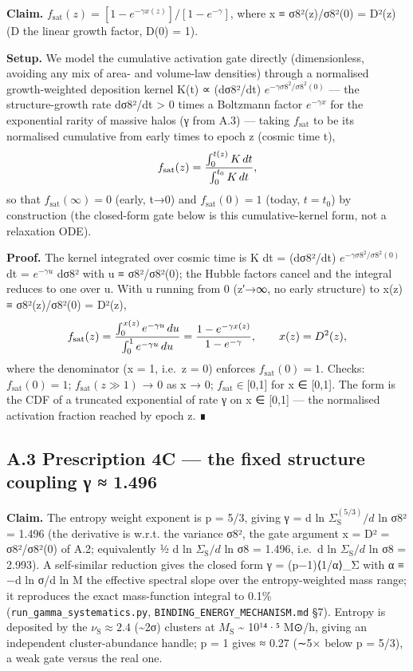 \documentclass[
  10pt,
]{article}
\begin{document}
\textbf{Claim.}
\(f_{\mathrm{sat}}(z) = [1 - e^{-\gamma  x(z)}]/[1 - e^{-\gamma }]\),
where x ≡ σ8²(z)/σ8²(0) = D²(z) (D the linear growth factor, D(0) = 1).

\textbf{Setup.} We model the cumulative activation gate directly
(dimensionless, avoiding any mix of area- and volume-law densities)
through a normalised growth-weighted deposition kernel K(t) ∝ (dσ8²/dt)
\(e^{-\gamma \sigma 8^{2}/\sigma 8^{2}(0)}\) --- the structure-growth
rate dσ8²/dt \textgreater{} 0 times a Boltzmann factor \(e^{-\gamma x}\)
for the exponential rarity of massive halos (γ from A.3) --- taking
\(f_{\mathrm{sat}}\) to be its normalised cumulative from early times to
epoch z (cosmic time t),
\[f_{\rm sat}(z) = \frac{\int_0^{t(z)} K\,dt}{\int_0^{t_0} K\,dt},\] so
that \(f_{\mathrm{sat}}(\infty ) = 0\) (early, t→0) and
\(f_{\mathrm{sat}}(0) = 1\) (today, \(t = t_{0}\)) by construction (the
closed-form gate below is this cumulative-kernel form, not a relaxation
ODE).

\textbf{Proof.} The kernel integrated over cosmic time is K dt =
(dσ8²/dt) \(e^{-\gamma \sigma 8^{2}/\sigma 8^{2}(0)}\) dt =
\(e^{-\gamma u}\) dσ8² with u ≡ σ8²/σ8²(0); the Hubble factors cancel
and the integral reduces to one over u. With u running from 0 (z′→∞, no
early structure) to x(z) ≡ σ8²(z)/σ8²(0) = D²(z),
\[f_{\rm sat}(z) = \frac{\int_0^{x(z)} e^{-\gamma u}\,du}{\int_0^{1} e^{-\gamma u}\,du}
= \frac{1 - e^{-\gamma x(z)}}{1 - e^{-\gamma}}, \qquad x(z) = D^2(z),\]
where the denominator (x = 1, i.e.~z = 0) enforces
\(f_{\mathrm{sat}}(0) = 1\). Checks: \(f_{\mathrm{sat}}(0) = 1\);
\(f_{\mathrm{sat}}(z \gg  1)\) → 0 as x → 0;
\(f_{\mathrm{sat}} \in  [0\),1{]} for x ∈ {[}0,1{]}. The form is the CDF
of a truncated exponential of rate γ on x ∈ {[}0,1{]} --- the normalised
activation fraction reached by epoch z. ∎

\subsection{A.3 Prescription 4C --- the fixed structure coupling γ ≈
1.496}\label{a.3-prescription-4c-the-fixed-structure-coupling-ux3b3-1.496}

\textbf{Claim.} The entropy weight exponent is p = 5/3, giving γ = d ln
\(\Sigma _{\mathrm{S}}^{(5/3)}/d\) ln σ8² = 1.496 (the derivative is
w.r.t. the variance σ8², the gate argument x = D² = σ8²/σ8²(0) of A.2;
equivalently ½ d ln \(\Sigma _{\mathrm{S}}/d\) ln σ8 = 1.496, i.e.~d ln
\(\Sigma _{\mathrm{S}}/d\) ln σ8 = 2.993). A self-similar reduction
gives the closed form γ = (p−1)⟨1/α⟩\_Σ with α ≡ −d ln σ/d ln M the
effective spectral slope over the entropy-weighted mass range; it
reproduces the exact mass-function integral to 0.1\%
(\texttt{run\_gamma\_systematics.py},
\texttt{BINDING\_ENERGY\_MECHANISM.md} §7). Entropy is deposited by the
\(\nu _{\mathrm{S}} \approx  2.4\) (\textasciitilde2σ) clusters at
\(M_{\mathrm{S}}\) \textasciitilde{} 10¹⁴·⁵ M⊙/h, giving an independent
cluster-abundance handle; p = 1 gives ≈ 0.27 (∼5× below p = 5/3), a weak
gate versus the real one.
\end{document}
